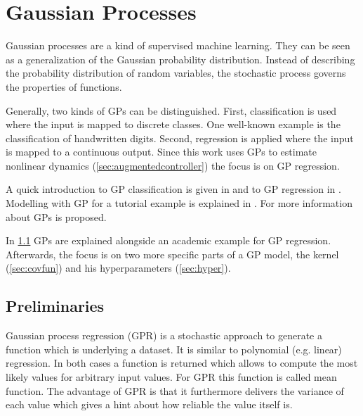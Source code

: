 \chapter{Gaussian Processes}
\label{cha:gaussianprocesses}

Gaussian processes are a kind of supervised machine learning.
They can be seen as a generalization of the Gaussian probability distribution.
Instead of describing the probability distribution of random variables, the stochastic process governs the properties of functions.

Generally, two kinds of GPs can be distinguished.
First, classification is used where the input is mapped to discrete classes.
One well-known example is the classification of handwritten digits.
Second, regression is applied where the input is mapped to a continuous output.
Since this work uses GPs to estimate nonlinear dynamics (\cref{sec:augmentedcontroller}) the focus is on GP regression.

A quick introduction to GP classification is given in \cite{Ebden.2008b} and to GP regression in \cite{Ebden.2008}.
Modelling with GP for a tutorial example is explained in \cite{Gray.2003}.
For more information about GPs \cite{Rasmussen.2006} is proposed.

In \cref{sec:gpex} GPs are explained alongside an academic example for GP regression.
Afterwards, the focus is on two more specific parts of a GP model, the kernel (\cref{sec:covfun}) and his hyperparameters (\cref{sec:hyper}).


\section{Preliminaries}
\label{sec:gpex}
Gaussian process regression (GPR) is a stochastic approach to generate a function which is underlying a dataset.
It is similar to polynomial (e.g. linear) regression.
In both cases a function is returned which allows to compute the most likely values for arbitrary input values.
For GPR this function is called mean function.
The advantage of GPR is that it furthermore delivers the variance of each value which gives a hint about how reliable the value itself is.


